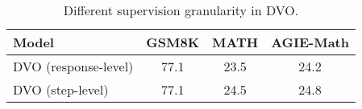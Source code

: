 \begin{table}[t]
\centering\small
\begin{tabular}{@{}l|ccc@{}}
\toprule
Model &  GSM8K & MATH & AGIE-Math\\
\midrule
DVO (response-level)                                                & 77.1                      & 23.5                      & 24.2                               \\
DVO (step-level)                                                & 77.1                      & 24.5                      & 24.8                               \\
\bottomrule
\end{tabular}
\caption{Different supervision granularity in DVO.}
\label{tab:dvo_response.result}
\end{table}
